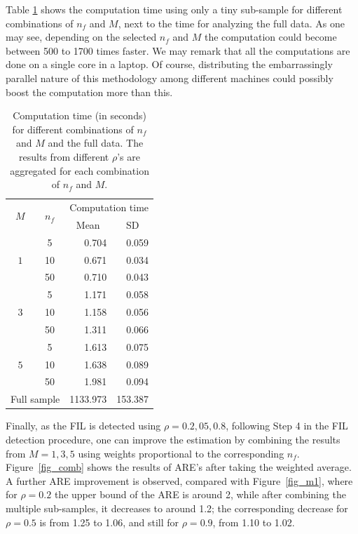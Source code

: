 \documentclass[11pt,a5paper,twoside]{book}
\begin{document}
Table \ref{tab_comp_time} shows the computation time using only a tiny sub-sample for different combinations of $n_f$ and $M$, next to the time for analyzing the full data. As one may see, depending on the selected $n_f$ and $M$ the computation could become between 500 to 1700 times faster. We may remark that all the computations are done on a single core in a laptop. Of course, distributing the embarrassingly parallel nature of this methodology among different machines could possibly boost the computation more than this. 
\begin{table}[ht]
\caption[Computation time (in seconds) for different combinations of $n_f$ and $M$ and the full data.]{Computation time (in seconds) for different combinations of $n_f$ and $M$ and the full data. The results from different $\rho$'s are aggregated for each combination of $n_f$ and $M$.}
\label{tab_comp_time}
\centering
\begin{tabular}{ccrr}
  \hline \hline
\multirow{2}{*}{$M$} & \multirow{2}{*}{$n_f$} & \multicolumn{2}{c}{Computation time} \\ 
 &  & \multicolumn{1}{c}{Mean} & \multicolumn{1}{c}{SD} \\ 
  \hline
\multirow{3}{*}{$1$} &  5 & 0.704 & 0.059 \\ 
 & 10 & 0.671 & 0.034 \\ 
 & 50 & 0.710 & 0.043 \\ 
\multirow{3}{*}{$3$} & 5 & 1.171 & 0.058 \\ 
 & 10 & 1.158 & 0.056 \\ 
 & 50 & 1.311 & 0.066 \\ 
\multirow{3}{*}{$5$} & 5 & 1.613 & 0.075 \\ 
 & 10 & 1.638 & 0.089 \\ 
 & 50 & 1.981 & 0.094 \\ 
\multicolumn{2}{c}{Full sample} & 1133.973 & 153.387 \\ 
   \hline \hline
\end{tabular}
\end{table}
Finally, as the FIL is detected using $\rho=0.2,05,0.8$, following Step 4 in the FIL detection procedure, one can improve the estimation by combining the results from $M=1,3,5$ using weights proportional to the corresponding $n_f$. Figure~\ref{fig_comb} shows the results of ARE's after taking the weighted average. A further ARE improvement is observed, compared with Figure~\ref{fig_m1}, where for $\rho=0.2$ the upper bound of the ARE is around 2, while after combining the multiple sub-samples, it decreases to around 1.2; the corresponding decrease for $\rho=0.5$ is from 1.25 to 1.06, and still for $\rho=0.9$, from 1.10 to 1.02. 
\end{document}
